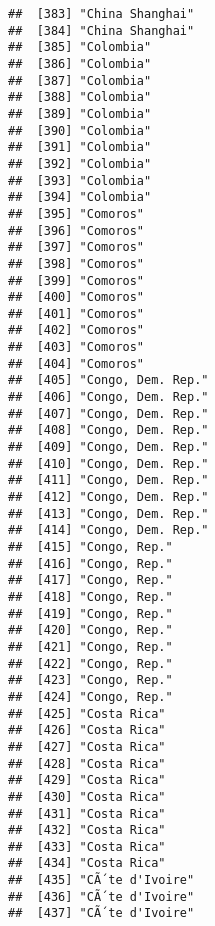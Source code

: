 \documentclass[]{article}
\begin{document}
\begin{verbatim}
##  [383] "China Shanghai"                     
##  [384] "China Shanghai"                     
##  [385] "Colombia"                           
##  [386] "Colombia"                           
##  [387] "Colombia"                           
##  [388] "Colombia"                           
##  [389] "Colombia"                           
##  [390] "Colombia"                           
##  [391] "Colombia"                           
##  [392] "Colombia"                           
##  [393] "Colombia"                           
##  [394] "Colombia"                           
##  [395] "Comoros"                            
##  [396] "Comoros"                            
##  [397] "Comoros"                            
##  [398] "Comoros"                            
##  [399] "Comoros"                            
##  [400] "Comoros"                            
##  [401] "Comoros"                            
##  [402] "Comoros"                            
##  [403] "Comoros"                            
##  [404] "Comoros"                            
##  [405] "Congo, Dem. Rep."                   
##  [406] "Congo, Dem. Rep."                   
##  [407] "Congo, Dem. Rep."                   
##  [408] "Congo, Dem. Rep."                   
##  [409] "Congo, Dem. Rep."                   
##  [410] "Congo, Dem. Rep."                   
##  [411] "Congo, Dem. Rep."                   
##  [412] "Congo, Dem. Rep."                   
##  [413] "Congo, Dem. Rep."                   
##  [414] "Congo, Dem. Rep."                   
##  [415] "Congo, Rep."                        
##  [416] "Congo, Rep."                        
##  [417] "Congo, Rep."                        
##  [418] "Congo, Rep."                        
##  [419] "Congo, Rep."                        
##  [420] "Congo, Rep."                        
##  [421] "Congo, Rep."                        
##  [422] "Congo, Rep."                        
##  [423] "Congo, Rep."                        
##  [424] "Congo, Rep."                        
##  [425] "Costa Rica"                         
##  [426] "Costa Rica"                         
##  [427] "Costa Rica"                         
##  [428] "Costa Rica"                         
##  [429] "Costa Rica"                         
##  [430] "Costa Rica"                         
##  [431] "Costa Rica"                         
##  [432] "Costa Rica"                         
##  [433] "Costa Rica"                         
##  [434] "Costa Rica"                         
##  [435] "CÃ´te d'Ivoire"                      
##  [436] "CÃ´te d'Ivoire"                      
##  [437] "CÃ´te d'Ivoire"                      

\end{verbatim}
\end{document}
